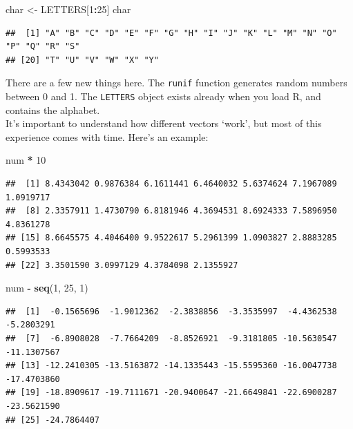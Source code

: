 \documentclass[
]{book}
\newenvironment{Shaded}{\begin{snugshade}}{\end{snugshade}}
\newcommand{\DecValTok}[1]{\textcolor[rgb]{0.00,0.00,0.81}{#1}}
\newcommand{\KeywordTok}[1]{\textcolor[rgb]{0.13,0.29,0.53}{\textbf{#1}}}
\newcommand{\NormalTok}[1]{#1}
\newcommand{\OperatorTok}[1]{\textcolor[rgb]{0.81,0.36,0.00}{\textbf{#1}}}
\newcommand{\StringTok}[1]{\textcolor[rgb]{0.31,0.60,0.02}{#1}}
\begin{document}
\begin{Shaded}
\begin{Highlighting}[]
\NormalTok{char <-}\StringTok{ }\NormalTok{LETTERS[}\DecValTok{1}\OperatorTok{:}\DecValTok{25}\NormalTok{]}
\NormalTok{char}
\end{Highlighting}
\end{Shaded}

\begin{verbatim}
##  [1] "A" "B" "C" "D" "E" "F" "G" "H" "I" "J" "K" "L" "M" "N" "O" "P" "Q" "R" "S"
## [20] "T" "U" "V" "W" "X" "Y"
\end{verbatim}

There are a few new things here. The \texttt{runif} function generates random numbers
between 0 and 1. The \texttt{LETTERS} object exists already when you load R, and
contains the alphabet.\\

It's important to understand how different vectors `work', but most of this
experience comes with time. Here's an example:

\begin{Shaded}
\begin{Highlighting}[]
\NormalTok{num }\OperatorTok{*}\StringTok{ }\DecValTok{10}
\end{Highlighting}
\end{Shaded}

\begin{verbatim}
##  [1] 8.4343042 0.9876384 6.1611441 6.4640032 5.6374624 7.1967089 1.0919717
##  [8] 2.3357911 1.4730790 6.8181946 4.3694531 8.6924333 7.5896950 4.8361278
## [15] 8.6645575 4.4046400 9.9522617 5.2961399 1.0903827 2.8883285 0.5993533
## [22] 3.3501590 3.0997129 4.3784098 2.1355927
\end{verbatim}

\begin{Shaded}
\begin{Highlighting}[]
\NormalTok{num }\OperatorTok{-}\StringTok{ }\KeywordTok{seq}\NormalTok{(}\DecValTok{1}\NormalTok{, }\DecValTok{25}\NormalTok{, }\DecValTok{1}\NormalTok{)}
\end{Highlighting}
\end{Shaded}

\begin{verbatim}
##  [1]  -0.1565696  -1.9012362  -2.3838856  -3.3535997  -4.4362538  -5.2803291
##  [7]  -6.8908028  -7.7664209  -8.8526921  -9.3181805 -10.5630547 -11.1307567
## [13] -12.2410305 -13.5163872 -14.1335443 -15.5595360 -16.0047738 -17.4703860
## [19] -18.8909617 -19.7111671 -20.9400647 -21.6649841 -22.6900287 -23.5621590
## [25] -24.7864407
\end{verbatim}
\end{document}

